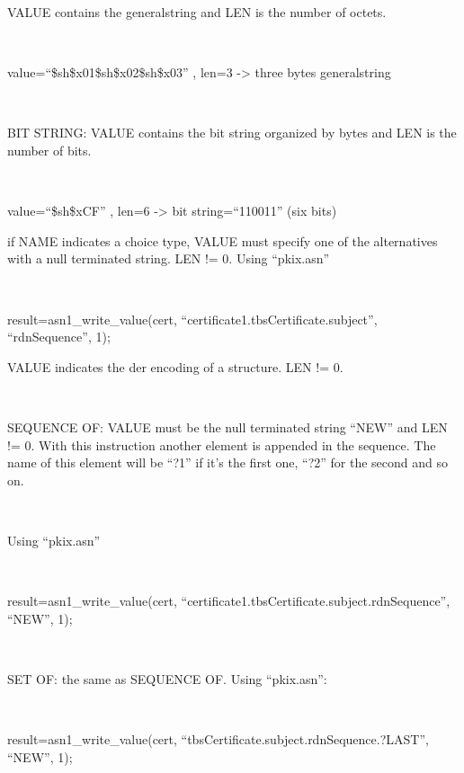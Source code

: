 \documentclass[]{article}
\begin{document}
VALUE contains the generalstring and LEN is the number of octets.

~

value=``\$sh\$x01\$sh\$x02\$sh\$x03'' , len=3 -\textgreater{} three
bytes generalstring

~

BIT STRING: VALUE contains the bit string organized by bytes and LEN is
the number of bits.

~

value=``\$sh\$xCF'' , len=6 -\textgreater{} bit string=``110011'' (six
bits)


if NAME indicates a choice type, VALUE must specify one of the
alternatives with a null terminated string. LEN != 0. Using ``pkix.asn''

~

result=asn1\_write\_value(cert, ``certificate1.tbsCertificate.subject'',
``rdnSequence'', 1);


VALUE indicates the der encoding of a structure. LEN != 0.

~

SEQUENCE OF: VALUE must be the null terminated string ``NEW'' and LEN !=
0. With this instruction another element is appended in the sequence.
The name of this element will be ``?1'' if it's the first one, ``?2''
for the second and so on.

~

Using ``pkix.asn''

~

result=asn1\_write\_value(cert,
``certificate1.tbsCertificate.subject.rdnSequence'', ``NEW'', 1);

~

SET OF: the same as SEQUENCE OF. Using ``pkix.asn'':

~

result=asn1\_write\_value(cert,
``tbsCertificate.subject.rdnSequence.?LAST'', ``NEW'', 1);

\end{document}
